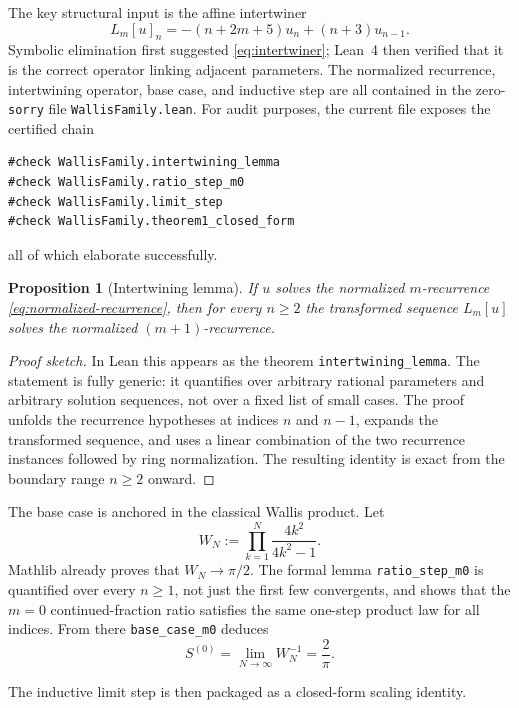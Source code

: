 \documentclass[11pt,reqno]{amsart}
\theoremstyle{plain}
\newtheorem{proposition}[theorem]{Proposition}
\theoremstyle{definition}
\theoremstyle{remark}
\begin{document}
The key structural input is the affine intertwiner
\begin{equation}\label{eq:intertwiner}
  L_m[u]_n = -(n+2m+5)u_n + (n+3)u_{n-1}.
\end{equation}
Symbolic elimination first suggested \eqref{eq:intertwiner}; Lean~4 then verified that it is the correct operator linking adjacent parameters.  The normalized recurrence, intertwining operator, base case, and inductive step are all contained in the zero-\texttt{sorry} file \texttt{WallisFamily.lean}.  For audit purposes, the current file exposes the certified chain
\begin{lstlisting}
#check WallisFamily.intertwining_lemma
#check WallisFamily.ratio_step_m0
#check WallisFamily.limit_step
#check WallisFamily.theorem1_closed_form
\end{lstlisting}
all of which elaborate successfully.

\begin{proposition}[Intertwining lemma]\label{prop:intertwining}
If $u$ solves the normalized $m$-recurrence \eqref{eq:normalized-recurrence}, then for every $n \ge 2$ the transformed sequence $L_m[u]$ solves the normalized $(m+1)$-recurrence.
\end{proposition}

\begin{proof}[Proof sketch]
In Lean this appears as the theorem \texttt{intertwining\_lemma}.  The statement is fully generic: it quantifies over arbitrary rational parameters and arbitrary solution sequences, not over a fixed list of small cases.  The proof unfolds the recurrence hypotheses at indices $n$ and $n-1$, expands the transformed sequence, and uses a linear combination of the two recurrence instances followed by ring normalization.  The resulting identity is exact from the boundary range $n \ge 2$ onward.
\end{proof}

The base case is anchored in the classical Wallis product.  Let
\[
  W_N := \prod_{k=1}^{N}\frac{4k^2}{4k^2-1}.
\]
Mathlib already proves that $W_N \to \pi/2$.  The formal lemma \texttt{ratio\_step\_m0} is quantified over every $n \ge 1$, not just the first few convergents, and shows that the $m=0$ continued-fraction ratio satisfies the same one-step product law for all indices.  From there \texttt{base\_case\_m0} deduces
\[
  S^{(0)} = \lim_{N\to\infty} W_N^{-1} = \frac{2}{\pi}.
\]

The inductive limit step is then packaged as a closed-form scaling identity.
\end{document}
